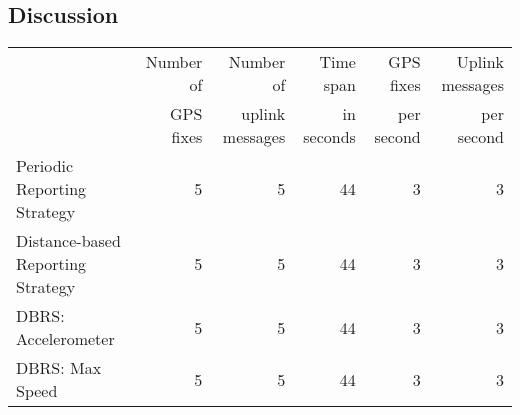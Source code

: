 \subsection{Discussion}


\begin{tabular}{l r r r r r}
& Number of & Number of & Time span & GPS fixes & Uplink messages \\
& GPS fixes & uplink messages & in seconds & per second & per second \\
\hline
Periodic Reporting Strategy & 5 & 5 & 44 & 3 & 3 \\
\hline
Distance-based Reporting Strategy & 5 & 5 & 44 & 3 & 3 \\
\hline
DBRS: Accelerometer & 5 & 5 & 44 & 3 & 3 \\
\hline
DBRS: Max Speed & 5 & 5 & 44 & 3 & 3 \\
\hline
\end{tabular}